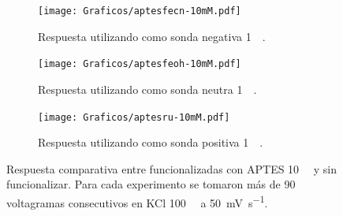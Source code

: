 		  	 \begin{figure}[ht]	
					\begin{subfigure}[t]{0.495\textwidth}
			 	    \texttt{[image: Graficos/aptesfecn-10mM.pdf]}
			        \caption{Respuesta utilizando como sonda negativa \ferroferri\space \SI{1}{\milli\Molar}.}
			        \label{fig:aptes10mM-vc-fe}
			        \end{subfigure}
			        \begin{subfigure}[t]{0.495\textwidth}
			 	    \texttt{[image: Graficos/aptesfeoh-10mM.pdf]}
			        \caption{Respuesta utilizando como sonda neutra \fc\space \SI{1}{\milli\Molar}.}
			        \label{fig:aptes10mM-vc-fc}
			        \end{subfigure}
			       	\begin{center}
			        \begin{subfigure}[t]{0.60\textwidth}
			 	    \vspace*{5mm}
			 	    \texttt{[image: Graficos/aptesru-10mM.pdf]}
			        \caption{Respuesta utilizando como sonda positiva \aminorutenio\space \SI{1}{\milli\Molar}.}
			        \label{fig:aptes10mM-vc-ru}
			        \end{subfigure}
			        \end{center}
			        \caption[Voltagramas de \pdmZ$^P_3$ con \aminorutenio, \fc\space y \ferroferri]{Respuesta comparativa entre \pdmZ\space funcionalizadas con APTES \SI{10}{\milli\Molar} y sin funcionalizar. Para cada experimento se tomaron más de 90 voltagramas consecutivos en KCl \SI{100}{\milli\Molar} a \SI{50}{\milli\volt\per\second}.}
			        \label{fig:aptes10mM-vc}
			      	\end{figure}

		\null
		\vfill		

\let\thispagestyle=\originalstyle
